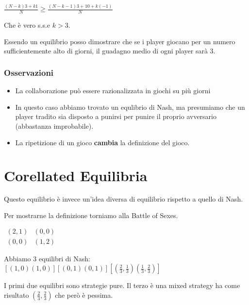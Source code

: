 \documentclass[10pt,a4paper]{report}
\begin{document}
        \begin{center}
            $\frac{(N-k)3 + k1}{N} \ge \frac{(N-k-1)3 + 10 + k(-1)}{N}$
        \end{center}

        Che è vero s.s.e $k>3$.

        Essendo un equilibrio posso dimostrare che se i player giocano per un numero sufficientemente alto di giorni, il guadagno medio di ogni player sarà 3.

        \subsubsection{Osservazioni}

        \begin{itemize}
            \item La collaborazione può essere razionalizzata in giochi su più giorni
            \item In questo caso abbiamo trovato un equlibrio di Nash, ma presumiamo che un player tradito sia disposto a punirsi per punire il proprio avversario (abbastanza improbabile).
            \item La ripetizione di un gioco \textbf{cambia} la definizione del gioco.
        \end{itemize}

        \section{Corellated Equilibria}

        Questo equilibrio è invece un'idea diversa di equilibrio rispetto a quello di Nash.

        Per mostrarne la definizione torniamo alla Battle of Sexes.

        \begin{center}
            $
            \begin{matrix}
                (2,1) & (0,0) \\
                (0,0) & (1,2) 
            \end{matrix}
            $    
        \end{center}

        Abbiamo 3 equilibri di Nash:
        $[(1,0)(1,0)][(0,1)(0,1)][(\frac{2}{3},\frac{1}{3})(\frac{1}{3}, \frac{2}{3})]$

        I primi due equilibri sono strategie pure. Il terzo è una mixed strategy ha come risultato $(\frac{2}{3}, \frac{2}{3})$ che però è pessima.
\end{document}

